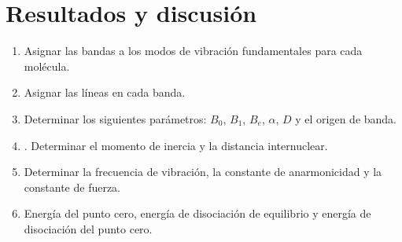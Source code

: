 \documentclass{tufte-handout}
\begin{document}
\section{Resultados y discusión}
\begin{enumerate}
\item Asignar las bandas a los modos de vibración fundamentales para cada molécula.
\item Asignar las líneas en cada banda.
\item Determinar los siguientes parámetros: $B_0$, $B_1$, $B_e$, $\alpha$, $D$ y el origen de banda.
\item. Determinar el momento de inercia y la distancia internuclear.
\item Determinar la frecuencia de vibración, la constante de anarmonicidad y la constante de fuerza.
\item Energía del punto cero, energía de disociación de equilibrio y energía de disociación
del punto cero.
\end{enumerate}
\end{document}
